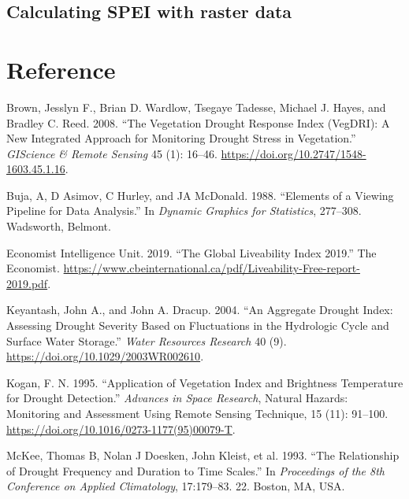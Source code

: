 \documentclass[
]{article}
\newlength{\cslhangindent}
\newlength{\cslentryspacingunit} %
\newenvironment{CSLReferences}[2] %
 {%
  \setlength{\parindent}{0pt}
  \ifodd #1
  \let\oldpar\par
  \def\par{\hangindent=\cslhangindent\oldpar}
  \fi
  \setlength{\parskip}{#2\cslentryspacingunit}
 }%
 {}
\begin{document}
\hypertarget{calculating-spei-with-raster-data}{%
\subsection{Calculating SPEI with raster
data}\label{calculating-spei-with-raster-data}}

\hypertarget{reference}{%
\section*{Reference}\label{reference}}

\hypertarget{refs}{}
\begin{CSLReferences}{1}{0}
\leavevmode{}%
Brown, Jesslyn F., Brian D. Wardlow, Tsegaye Tadesse, Michael J. Hayes,
and Bradley C. Reed. 2008. {``The {Vegetation} {Drought} {Response}
{Index} ({VegDRI}): {A} {New} {Integrated} {Approach} for {Monitoring}
{Drought} {Stress} in {Vegetation}.''} \emph{GIScience \& Remote
Sensing} 45 (1): 16--46.
\url{https://doi.org/10.2747/1548-1603.45.1.16}.

\leavevmode{}%
Buja, A, D Asimov, C Hurley, and JA McDonald. 1988. {``Elements of a
Viewing Pipeline for Data Analysis.''} In \emph{Dynamic Graphics for
Statistics}, 277--308. Wadsworth, Belmont.

\leavevmode{}%
Economist Intelligence Unit. 2019. {``The Global Liveability Index
2019.''} The Economist.
\url{https://www.cbeinternational.ca/pdf/Liveability-Free-report-2019.pdf}.

\leavevmode{}%
Keyantash, John A., and John A. Dracup. 2004. {``An Aggregate Drought
Index: {Assessing} Drought Severity Based on Fluctuations in the
Hydrologic Cycle and Surface Water Storage.''} \emph{Water Resources
Research} 40 (9). \url{https://doi.org/10.1029/2003WR002610}.

\leavevmode{}%
Kogan, F. N. 1995. {``Application of Vegetation Index and Brightness
Temperature for Drought Detection.''} \emph{Advances in Space Research},
Natural {Hazards}: {Monitoring} and {Assessment} {Using} {Remote}
{Sensing} {Technique}, 15 (11): 91--100.
\url{https://doi.org/10.1016/0273-1177(95)00079-T}.

\leavevmode{}%
McKee, Thomas B, Nolan J Doesken, John Kleist, et al. 1993. {``The
Relationship of Drought Frequency and Duration to Time Scales.''} In
\emph{Proceedings of the 8th Conference on Applied Climatology},
17:179--83. 22. Boston, MA, USA.


\end{CSLReferences}
\end{document}
